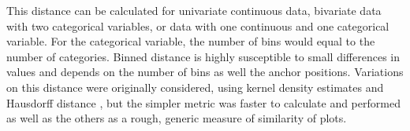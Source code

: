 \documentclass[12]{article}
\newcommand{\green}[1]{{\color{cyan} #1}}
\begin{document}
\begin{itemize}
%
%
%
%
%

This distance can be calculated for univariate continuous data, bivariate data with two categorical variables, or data with one continuous and one categorical variable. For the categorical variable, the number of bins would equal to the number of categories.
Binned distance is highly susceptible to small differences in values and depends on the number of bins as well the anchor positions. Variations on this distance were originally considered, using kernel density estimates and Hausdorff distance \citep{huttenlocher:1993}, but the simpler metric was faster to calculate and performed as well as the others as a rough, generic measure of similarity of plots.



\end{itemize}
\end{document}
